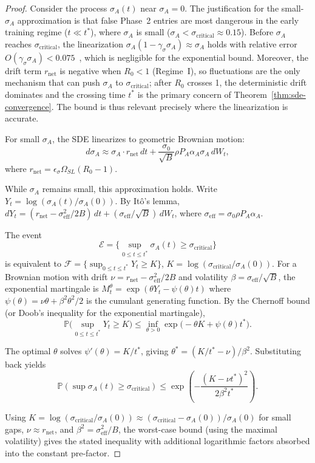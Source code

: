 \begin{proof}
Consider the process $\sigma_A(t)$ near $\sigma_A = 0$. The justification
for the small-$\sigma_A$ approximation is that false Phase~2 entries are
most dangerous in the early training regime ($t \ll t^*$), where
$\sigma_A$ is small ($\sigma_A < \sigma_{\mathrm{critical}} \approx 0.15$).
Before $\sigma_A$ reaches $\sigma_{\mathrm{critical}}$, the linearization
$\sigma_A(1 - \gamma_\sigma \sigma_A) \approx \sigma_A$ holds with relative
error $O(\gamma_\sigma \sigma_A) < 0.075$~, which is negligible for the
exponential bound. Moreover, the drift term $r_{\mathrm{net}}$ is negative
when $R_0 < 1$ (Regime~I), so fluctuations are the only mechanism that can
push $\sigma_A$ to $\sigma_{\mathrm{critical}}$; after $R_0$ crosses 1,
the deterministic drift dominates and the crossing time $t^*$ is the
primary concern of
Theorem~\ref{thm:sde-convergence}. The bound is thus relevant
precisely where the linearization is accurate.

For small $\sigma_A$, the SDE linearizes to geometric Brownian motion:
\[
d\sigma_A \approx \sigma_A \cdot r_{\mathrm{net}} \, dt
+ \frac{\sigma_0}{\sqrt{B}} \rho P_A \alpha_A \sigma_A \, dW_t,
\]
where $r_{\mathrm{net}} = \epsilon_\sigma \Omega_{SL}(R_0 - 1)$.

While $\sigma_A$ remains small, this approximation holds. Write
$Y_t = \log(\sigma_A(t)/\sigma_A(0))$. By It\^o's lemma,
$dY_t = (r_{\mathrm{net}} - \sigma_{\mathrm{eff}}^2/2B)\, dt
+ (\sigma_{\mathrm{eff}}/\sqrt{B})\, dW_t$,
where $\sigma_{\mathrm{eff}} = \sigma_0 \rho P_A \alpha_A$.

The event
\[
\mathcal{E} = \bigl\{\sup_{0 \leq t \leq t^*} \sigma_A(t) \geq
\sigma_{\mathrm{critical}}\bigr\}
\]
is equivalent to
$\mathcal{F} = \{\sup_{0 \leq t \leq t^*} Y_t \geq K\}$,
$K = \log(\sigma_{\mathrm{critical}}/\sigma_A(0))$.
For a Brownian motion with drift
$\nu = r_{\mathrm{net}} - \sigma_{\mathrm{eff}}^2/2B$ and
volatility $\beta = \sigma_{\mathrm{eff}}/\sqrt{B}$, the exponential
martingale is $M_t^\theta = \exp(\theta Y_t - \psi(\theta) t)$ where
$\psi(\theta) = \nu \theta + \beta^2 \theta^2/2$ is the cumulant
generating function. By the Chernoff bound (or Doob's inequality for
the exponential martingale),
\[
\mathbb{P}\bigl(\sup_{0 \leq t \leq t^*} Y_t \geq K\bigr)
\leq \inf_{\theta > 0} \exp\bigl(-\theta K + \psi(\theta) t^*\bigr).
\]

The optimal $\theta$ solves $\psi'(\theta) = K/t^*$, giving
$\theta^* = (K/t^* - \nu)/\beta^2$. Substituting back yields
\[
\mathbb{P}(\sup \sigma_A(t) \geq \sigma_{\mathrm{critical}})
\leq \exp\!\left(
-\frac{(K - \nu t^*)^2}{2 \beta^2 t^*}
\right).
\]

Using $K = \log(\sigma_{\mathrm{critical}}/\sigma_A(0)) \approx
(\sigma_{\mathrm{critical}} - \sigma_A(0))/\sigma_A(0)$ for small gaps,
$\nu \approx r_{\mathrm{net}}$, and $\beta^2 = \sigma_{\mathrm{eff}}^2/B$,
the worst-case bound (using the maximal volatility) gives the stated
inequality with additional logarithmic factors absorbed into the
constant pre-factor.
\end{proof}


